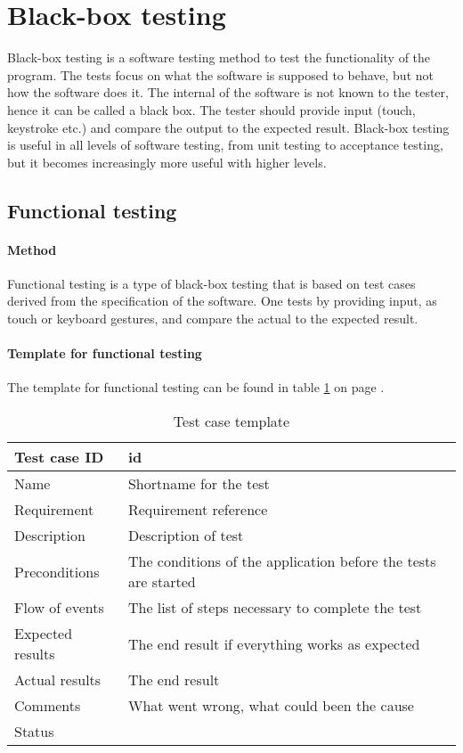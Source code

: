 
\section{Black-box testing}
		Black-box testing is a software testing method to test the functionality of the program. The tests focus on what the software is supposed to behave, but not how the software does it. The internal of the software is not known to the tester, hence it can be called a black box. The tester should provide input (touch, keystroke etc.) and compare the output to the expected result. Black-box testing is useful in all levels of software testing, from unit testing to acceptance testing, but it becomes increasingly more useful with higher levels. 
	
		\subsection{Functional testing}
			\paragraph{Method}
				Functional testing is a type of black-box testing that is based on test cases derived from the specification of the software. One tests by providing input, as touch or keyboard gestures, and compare the actual to the expected result. 
			\paragraph{Template for functional testing}		
			The template for functional testing can be found in table \ref{tab:casetemp1} on page \pageref{tab:casetemp1}.	
				\begin{table}
					\begin{tabular}{l|p{10cm}}\hline
						Test case ID & id \\ \hline
						Name & Shortname for the test\\ \hline
						Requirement & Requirement reference\\ \hline
						Description & Description of test\\ \hline
						Preconditions & The conditions of the application before the tests are started\\ \hline
						Flow of events & The list of steps necessary to complete the test \\ \hline
						Expected results & The end result if everything works as expected\\ \hline 
						Actual results & The end result\\ \hline
						Comments & What went wrong, what could been the cause\\ \hline
						Status & \\ \hline
					\end{tabular}
				\caption{Test case template} \label{tab:casetemp1}
			\end{table}
